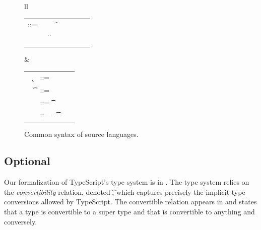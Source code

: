 \documentclass[a4paper,USenglish]{tex/lipics-v2016}
\begin{document}
\begin{figure}[!h]\hrulefill
	\vspace{2mm}  \small
	
	\begin{tabular}{ll}
		\begin{minipage}{6cm}\begin{tabular}{@{}l@{~}l@{}l@{}l@{}l@{}l@{}l@{}l}
				\e\hspace{.1cm} ::= & \hspace{.2cm} \x        
				&\B \this         
				&\B \FRead\f \\    
				&
				&\B \FWrite\f\e
				&\B \Call\e\m\e \\
				& 
				&\B \that      
				&\B \New\C{\e[1]..}  
		\end{tabular}\end{minipage}&
		\begin{minipage}{5cm}\begin{tabular}{l@{~}l@{}l@{}l}
				~ \k &::= \Class \C {\fd[1]..}{\md[1]..} \\
				~ \t&::= ~ \any  \B   \C \\ 
				\md &::= \Mdef\m\x\t\t\e \\
				~\fd&::= ~ \Fdef\f\t \\ 
		\end{tabular}\end{minipage} 
	\end{tabular}
	\vspace{2mm} 
\caption{Common syntax of source languages.}\label{f:sourcesyntax2}
\end{figure}

\subsection{Optional}

Our formalization of TypeScript's type system is in
. The type system relies on the \emph{convertibility}
relation, denoted \ConvertE{}\t\tp, which captures precisely the implicit
type conversions allowed by TypeScript.  The convertible relation appears in
 and states that a type is convertible to a super type and
that \any is convertible to anything and conversely. 
\end{document}
